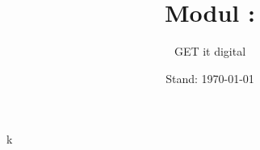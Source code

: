 \documentclass[aspectratio=1610]{beamer}
\title{Modul \GetItDigitalModulnumber : \GetItDigitalModulname}
\author{GET it digital}
\date{Stand: \today}
\begin{document}
k

\end{document}
